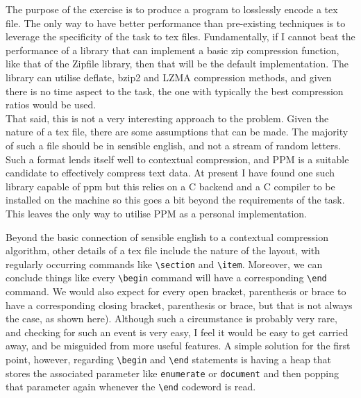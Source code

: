 \documentclass{homework}
\begin{document}
\maketitle


The purpose of the exercise is to produce a program to losslessly encode a tex file. The only way to have better performance than pre-existing techniques is to leverage the specificity of the task to tex files. 
Fundamentally, if I cannot beat the performance of a library that can implement a basic zip compression function, like that of the Zipfile library, then that will be the default implementation. The library can utilise deflate, bzip2 and LZMA compression methods, and given there is no time aspect to the task, the one with typically the best compression ratios would be used.\\

That said, this is not a very interesting approach to the problem. Given the nature of a tex file, there are some assumptions that can be made. The majority of such a file should be in sensible english, and not a stream of random letters. Such a format lends itself well to contextual compression, and PPM is a suitable candidate to effectively compress text data. At present I have found one such library capable of ppm but this relies on a C backend and a C compiler to be installed on the machine so this goes a bit beyond the requirements of the task. This leaves the only way to utilise PPM as a personal implementation.

Beyond the basic connection of sensible english to a contextual compression algorithm, other details of a tex file include the nature of the layout, with regularly occurring commands like \verb|\section| and \verb|\item|. Moreover, we can conclude things like every \verb|\begin| command will have a corresponding \verb|\end| command. We would also expect for every open bracket, parenthesis or brace to have a corresponding closing bracket, parenthesis or brace, but that is not always the case, as shown here). Although such a circumstance is probably very rare, and checking for such an event is very easy, I feel it would be easy to get carried away, and be misguided from more useful features. A simple solution for the first point, however, regarding \verb|\begin| and \verb|\end| statements is having a heap that stores the associated parameter like \texttt{enumerate} or \texttt{document} and then popping that parameter again whenever the \verb|\end| codeword is read.
\end{document}
